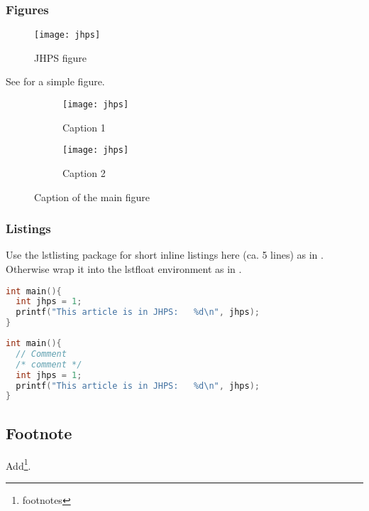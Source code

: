 \documentclass{jhps}
\begin{document}
\subsubsection{Figures}

\begin{figure}   %
\texttt{[image: jhps]}
\caption{JHPS figure}
\label{fig:jhps}
\end{figure}

See  for a simple figure.

\begin{figure}
  \begin{subfigure}[t]{3cm}
  \texttt{[image: jhps]}
  \caption{Caption 1}\label{fig:1a}
  \end{subfigure}
  \quad
  \begin{subfigure}[t]{3cm}
  \texttt{[image: jhps]}
  \caption{Caption 2}\label{fig:1b}
  \end{subfigure}
  \caption{Caption of the main figure}\label{fig:1}
\end{figure}


\subsubsection{Listings}

Use the lstlisting package for short inline listings here (ca.
5 lines) as in .
Otherwise wrap it into the lstfloat environment as in .

\begin{lstlisting}[caption="My listing",label=lst:listing,language=C,inputencoding={utf8},extendedchars=false]
int main(){
  int jhps = 1;
  printf("This article is in JHPS:   %d\n", jhps);
}
\end{lstlisting}

\begin{lstfloat}
  \begin{lstlisting}[caption="My longer listing",label=lst:longlisting,language=C]
int main(){
  // Comment
  /* comment */
  int jhps = 1;
  printf("This article is in JHPS:   %d\n", jhps);
}
  \end{lstlisting}
\end{lstfloat}


\subsection{Footnote}
Add\footnote{footnotes}.
\end{document}
